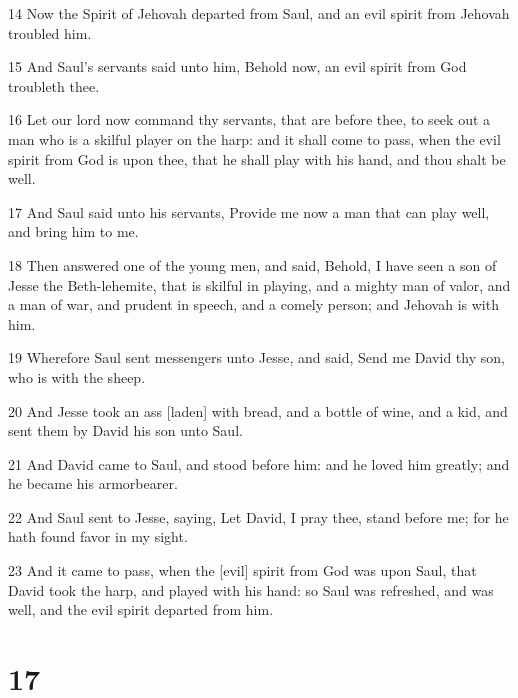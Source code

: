 \par 14 Now the Spirit of Jehovah departed from Saul, and an evil spirit from Jehovah troubled him.
\par 15 And Saul's servants said unto him, Behold now, an evil spirit from God troubleth thee.
\par 16 Let our lord now command thy servants, that are before thee, to seek out a man who is a skilful player on the harp: and it shall come to pass, when the evil spirit from God is upon thee, that he shall play with his hand, and thou shalt be well.
\par 17 And Saul said unto his servants, Provide me now a man that can play well, and bring him to me.
\par 18 Then answered one of the young men, and said, Behold, I have seen a son of Jesse the Beth-lehemite, that is skilful in playing, and a mighty man of valor, and a man of war, and prudent in speech, and a comely person; and Jehovah is with him.
\par 19 Wherefore Saul sent messengers unto Jesse, and said, Send me David thy son, who is with the sheep.
\par 20 And Jesse took an ass [laden] with bread, and a bottle of wine, and a kid, and sent them by David his son unto Saul.
\par 21 And David came to Saul, and stood before him: and he loved him greatly; and he became his armorbearer.
\par 22 And Saul sent to Jesse, saying, Let David, I pray thee, stand before me; for he hath found favor in my sight.
\par 23 And it came to pass, when the [evil] spirit from God was upon Saul, that David took the harp, and played with his hand: so Saul was refreshed, and was well, and the evil spirit departed from him.

\chapter{17}

